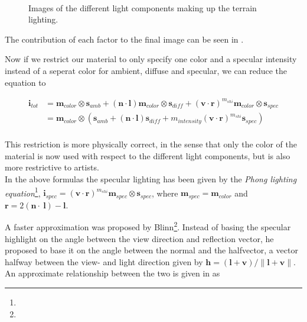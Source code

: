 \begin{figure}
  \centering
  \\
  \caption{Images of the different light components making up the
    terrain lighting.}
  \label{fig:lightComponents}
\end{figure}


The contribution of each factor to the final image can be seen in
.

Now if we restrict our material to only specify one color and a
specular intensity instead of a seperat color for ambient, diffuse and
specular, we can reduce the equation to

\begin{displaymath}
  \begin{array}{rl}
    \mathbf{i}_{tot} &= \mathbf{m}_{color} \otimes \mathbf{s}_{amb} + (\mathbf{n} \cdot
    \mathbf{l}) \mathbf{m}_{color} \otimes \mathbf{s}_{diff} +
    (\mathbf{v} \cdot \mathbf{r})^{m_{shi}} \mathbf{m}_{color} \otimes
    \mathbf{s}_{spec} \\
    &= \mathbf{m}_{color} \otimes (\mathbf{s}_{amb} + (\mathbf{n} \cdot
    \mathbf{l}) \mathbf{s}_{diff} + m_{intensity} (\mathbf{v} \cdot
    \mathbf{r})^{m_{shi}} \mathbf{s}_{spec}) \\
  \end{array}
\end{displaymath}

This restriction is more physically correct, in the sense that only
the color of the material is now used with respect to the different
light components, but is also more restrictive to artists.\\

In the above formulas the specular lighting has been given by the
\emph{Phong lighting equation}\footnote{},
$\mathbf{i}_{spec} = (\mathbf{v} \cdot \mathbf{r})^{m_{shi}}
\mathbf{m}_{spec} \otimes \mathbf{s}_{spec}$, where $\mathbf{m}_{spec}
= \mathbf{m}_{color}$ and $\mathbf{r} = 2 (\mathbf{n} \cdot
\ \mathbf{l}) - \mathbf{l}$.

A faster approximation was proposed by
Blinn\footnote{}. Instead of basing the
specular highlight on the angle between the view direction and
reflection vector, he proposed to base it on the angle between the
normal and the halfvector, a vector halfway between the view- and
light direction given by $\mathbf{h} = (\mathbf{l} + \mathbf{v}) /
\|\mathbf{l} + \mathbf{v}\|$. An approximate relationship between the
two is given in  as

